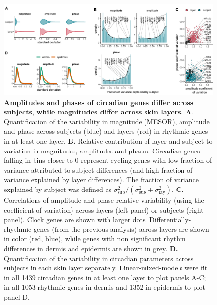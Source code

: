 \begin{figure}[t!]
	\begin{center}
		\includegraphics[width=\textwidth]{./Figures/fig2bis.pdf}
		\caption{\textbf{Amplitudes and phases of circadian genes differ across subjects, while magnitudes differ across skin layers. A.} Quantification of the variability in magnitude (MESOR), amplitude and phase across subjects (blue) and layers (red) in rhythmic genes in at least one layer. \textbf{B.} Relative contribution of layer and subject to variation in magnitudes, amplitudes and phases. Circadian genes falling in bins closer to 0 represent cycling genes with low fraction of variance attributed to subject differences (and high fraction of variance explained by layer differences). The fraction of variance explained by subject was defined as $\sigma^2_\textrm{sub}/(\sigma^2_\textrm{sub} + \sigma^2_\textrm{lay})$. \textbf{C.} Correlations of amplitude and phase relative variability (using the coefficient of variation) across layers (left panel) or subjects (right panel). Clock genes are shown with larger dots. Differentially-rhythmic genes (from the previous analysis) across layers are shown in color (red, blue), while genes with non significant rhythm differences in dermis and epidermis are shown in grey. \textbf{D. } Quantification of the variability in circadian parameters across subjects in each skin layer separately. Linear-mixed-models were fit in all 1439 circadian genes in at least one layer to plot panels A-C; in all 1053 rhythmic genes in dermis and 1352 in epidermis to plot panel D. }
		

\end{center}
\end{figure}
